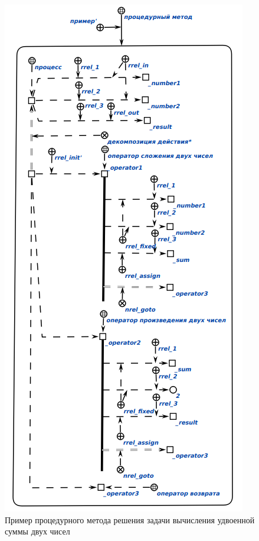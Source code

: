 \begin{figure}[htbp]  \center
  \includegraphics[width=1\linewidth]{figures/procedural_program.png}
  \caption{Пример процедурного метода решения задачи вычисления удвоенной суммы двух чисел}
  \label{fig:procedural_program}
\end{figure}

